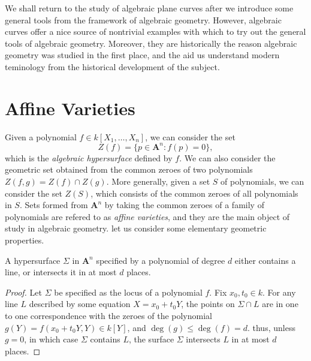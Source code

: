 We shall return to the study of algebraic plane curves after we introduce some general tools from the framework of algebraic geometry. However, algebraic curves offer a nice source of nontrivial examples with which to try out the general tools of algebraic geometry. Moreover, they are historically the reason algebraic geometry was studied in the first place, and the aid us understand modern teminology from the historical development of the subject.

\section{Affine Varieties}

Given a polynomial $f \in k[X_1, \dots, X_n]$, we can consider the set
%
\[ Z(f) = \{ p \in \mathbf{A}^n : f(p) = 0 \}, \]
%
which is the \emph{algebraic hypersurface} defined by $f$. We can also consider the geometric set obtained from the common zeroes of two polynomials $Z(f,g) = Z(f) \cap Z(g)$. More generally, given a set $S$ of polynomials, we can consider the set $Z(S)$, which consists of the common zeroes of all polynomials in $S$. Sets formed from $\mathbf{A}^n$ by taking the common zeroes of a family of polynomials are refered to as \emph{affine varieties}, and they are the main object of study in algebraic geometry. let us consider some elementary geometric properties.


\begin{theorem}
    A hypersurface $\Sigma$ in $\mathbf{A}^n$ specified by a polynomial of degree $d$ either contains a line, or intersects it in at most $d$ places.
\end{theorem}
\begin{proof}
    Let $\Sigma$ be specified as the locus of a polynomial $f$. Fix $x_0,t_0 \in k$. For any  line $L$ described by some equation $X = x_0 + t_0Y$, the points on $\Sigma \cap L$ are in one to one correspondence with the zeroes of the polynomial $g(Y) = f(x_0 + t_0Y,Y) \in k[Y]$, and $\deg(g) \leq \deg(f) = d$. thus, unless $g = 0$, in which case $\Sigma$ contains $L$, the surface $\Sigma$ intersects $L$ in at most $d$ places.
\end{proof}

